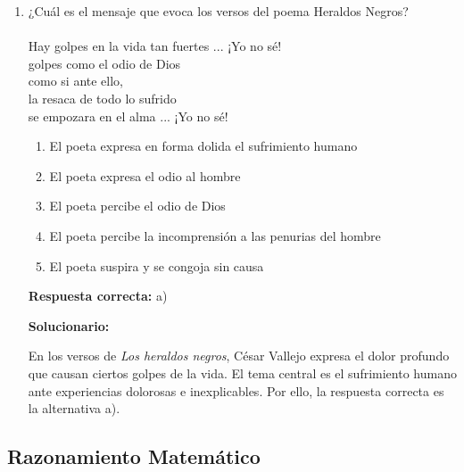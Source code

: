 \begin{enumerate}[resume]
	
	\item ¿Cuál es el mensaje que evoca los versos del poema Heraldos Negros?\\\\
	Hay golpes en la vida tan fuertes ... ¡Yo no sé!\\
	golpes como el odio de Dios\\
	como si ante ello,\\
	la resaca de todo lo sufrido\\
	se empozara en el alma ... ¡Yo no sé!
	
	\begin{enumerate}[label=\alph*)]
		\item El poeta expresa en forma dolida el sufrimiento humano
		\item El poeta expresa el odio al hombre
		\item El poeta percibe el odio de Dios
		\item El poeta percibe la incomprensión a las penurias del hombre
		\item El poeta suspira y se congoja sin causa
	\end{enumerate}
	
	\textbf{Respuesta correcta:} a)
	
	\vspace{2mm}
	\textbf{Solucionario:}
	
	En los versos de \textit{Los heraldos negros}, César Vallejo expresa el dolor profundo que causan ciertos golpes de la vida. El tema central es el sufrimiento humano ante experiencias dolorosas e inexplicables. Por ello, la respuesta correcta es la alternativa a).
	
\end{enumerate}

\subsection*{Razonamiento Matemático}

